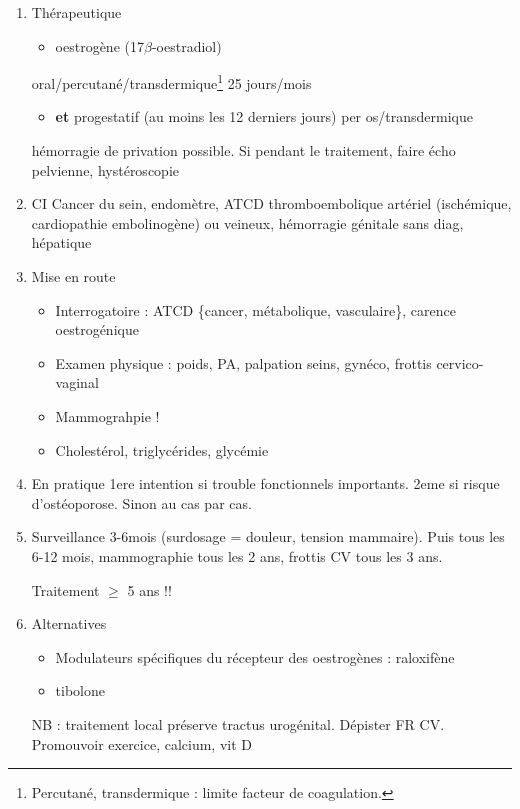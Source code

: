 \documentclass[11pt]{article}
\begin{document}
\begin{enumerate}
\item Thérapeutique
\label{sec:orga936217}
\begin{itemize}
\item oestrogène (17\(\beta\)-oestradiol)
\end{itemize}
oral/percutané/transdermique\footnote{Percutané, transdermique : limite \inc facteur de coagulation.} 25 jours/mois
\begin{itemize}
\item \textbf{et} progestatif (au moins les 12 derniers jours) per os/transdermique
\end{itemize}
\danger hémorragie de privation possible. Si pendant le traitement, faire écho
pelvienne, hystéroscopie

\item CI
\label{sec:org59c4eff}
Cancer du sein, endomètre, ATCD thromboembolique artériel (ischémique,
cardiopathie embolinogène) ou veineux, hémorragie génitale sans diag, hépatique

\item Mise en route
\label{sec:org616b11f}
\begin{itemize}
\item Interrogatoire : ATCD \{cancer, métabolique, vasculaire\}, carence oestrogénique
\item Examen physique : poids, PA, palpation seins, gynéco, frottis cervico-vaginal
\item Mammograhpie !
\item Cholestérol, triglycérides, glycémie
\end{itemize}

\item En pratique
\label{sec:org0d99dc1}
1ere intention si trouble fonctionnels importants. 2eme si risque
d'ostéoporose. Sinon au cas par cas.

\item Surveillance
\label{sec:org052fca0}
3-6mois (surdosage = douleur, tension mammaire). Puis tous les 6-12 mois,
mammographie tous les 2 ans, frottis CV tous les 3 ans.

Traitement \(\ge\) 5 ans !!

\item Alternatives
\label{sec:org6f91db6}
\begin{itemize}
\item Modulateurs spécifiques du récepteur des oestrogènes : raloxifène
\item tibolone
\end{itemize}

NB : traitement local préserve tractus urogénital. Dépister FR CV. Promouvoir
exercice, calcium, vit D
\end{enumerate}
\end{document}
